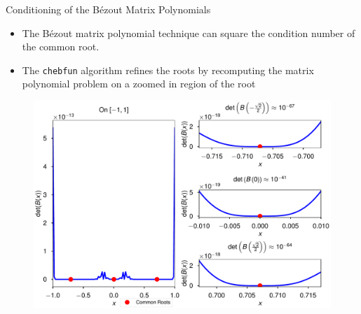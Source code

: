 \documentclass[xcolor={rgb,dvipsnames}]{beamer}		%
\begin{document}
\begin{frame}{Conditioning of the B\'{e}zout Matrix Polynomials}
\begin{itemize}
\item The B\'{e}zout matrix polynomial technique can square the condition number of the common root.\footnotemark[1]
\item The {\tt chebfun} algorithm refines the roots by recomputing the matrix polynomial problem on a zoomed in region of the root
\end{itemize}


\begin{center}
\begin{figure}
\includegraphics[height=.5\textheight]{bezout_det_plot.pdf}
\end{figure}
\end{center}
\end{frame}

%
\end{document}
